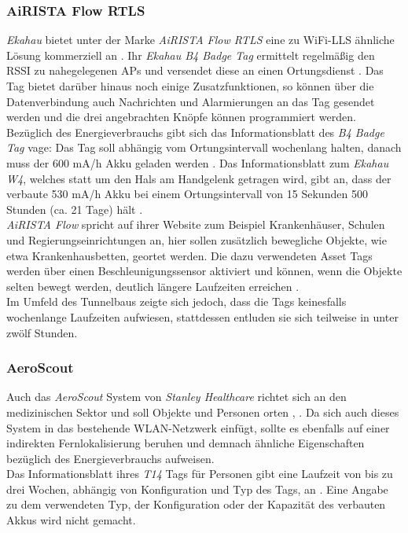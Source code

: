 \subsubsection{AiRISTA Flow RTLS}
\emph{Ekahau} bietet unter der Marke \textit{AiRISTA Flow RTLS} eine zu WiFi-LLS ähnliche Lösung kommerziell an \cite{airista2017airista}.
Ihr \emph{Ekahau B4 Badge Tag} ermittelt regelmäßig den RSSI zu nahegelegenen APs und versendet diese an einen Ortungsdienst \cite{liu2007survey}.
Das Tag bietet darüber hinaus noch einige Zusatzfunktionen, so können über die Datenverbindung auch Nachrichten und Alarmierungen an das Tag gesendet werden und die drei angebrachten Knöpfe können programmiert werden.\\
Bezüglich des Energieverbrauchs gibt sich das Informationsblatt des \emph{B4 Badge Tag} vage: Das Tag soll abhängig vom Ortungsintervall wochenlang halten, danach muss der 600 mA/h Akku geladen werden \cite{ekahau2017b4}.
Das Informationsblatt zum \emph{Ekahau W4}, welches statt um den Hals am Handgelenk getragen wird, gibt an, dass der verbaute 530 mA/h Akku bei einem Ortungsintervall von 15 Sekunden 500 Stunden (ca. 21 Tage) hält \cite{ekahau2017w4}.\\
\emph{AiRISTA Flow} spricht auf ihrer Website zum Beispiel Krankenhäuser, Schulen und Regierungseinrichtungen an, hier sollen zusätzlich bewegliche Objekte, wie etwa Krankenhausbetten, geortet werden.
Die dazu verwendeten Asset Tags werden über einen Beschleunigungssensor aktiviert und können, wenn die Objekte selten bewegt werden, deutlich längere Laufzeiten erreichen \cite{ekahau2017a4}. \\
Im Umfeld des Tunnelbaus zeigte sich jedoch, dass die Tags keinesfalls wochenlange Laufzeiten aufwiesen, stattdessen entluden sie sich teilweise in unter zwölf Stunden.

\subsubsection{AeroScout}
Auch das \emph{AeroScout} System von \emph{Stanley Healthcare} richtet sich an den medizinischen Sektor und soll Objekte und Personen orten \cite{aeroscout2017asset}, \cite{aeroscout2017staff}.
Da sich auch dieses System in das bestehende WLAN-Netzwerk einfügt, sollte es ebenfalls auf einer indirekten Fernlokalisierung beruhen und demnach ähnliche Eigenschaften bezüglich des Energieverbrauchs aufweisen.\\
Das Informationsblatt ihres \emph{T14} Tags für Personen gibt eine Laufzeit von bis zu drei Wochen, abhängig von Konfiguration und Typ des Tags, an \cite{aeroscout2017t14}. 
Eine Angabe zu dem verwendeten Typ, der Konfiguration oder der Kapazität des verbauten Akkus wird nicht gemacht.\\

